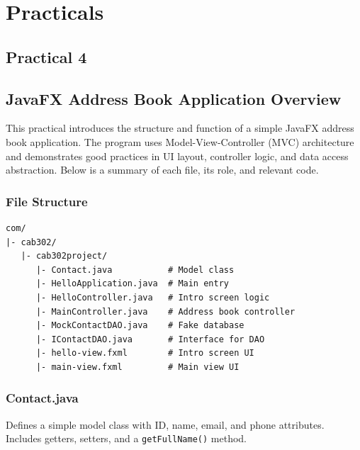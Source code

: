 \documentclass{article}
\begin{document}
\newpage
\section{Practicals}
\subsection{Practical 4}

\subsection{JavaFX Address Book Application Overview}

This practical introduces the structure and function of a simple JavaFX address book application. The program uses Model-View-Controller (MVC) architecture and demonstrates good practices in UI layout, controller logic, and data access abstraction. Below is a summary of each file, its role, and relevant code.

\subsubsection*{File Structure}
\begin{verbatim}
com/
|- cab302/
   |- cab302project/
      |- Contact.java           # Model class
      |- HelloApplication.java  # Main entry
      |- HelloController.java   # Intro screen logic
      |- MainController.java    # Address book controller
      |- MockContactDAO.java    # Fake database
      |- IContactDAO.java       # Interface for DAO
      |- hello-view.fxml        # Intro screen UI
      |- main-view.fxml         # Main view UI
\end{verbatim}


\subsubsection*{Contact.java}
Defines a simple model class with ID, name, email, and phone attributes. Includes getters, setters, and a \texttt{getFullName()} method.
\end{document}
